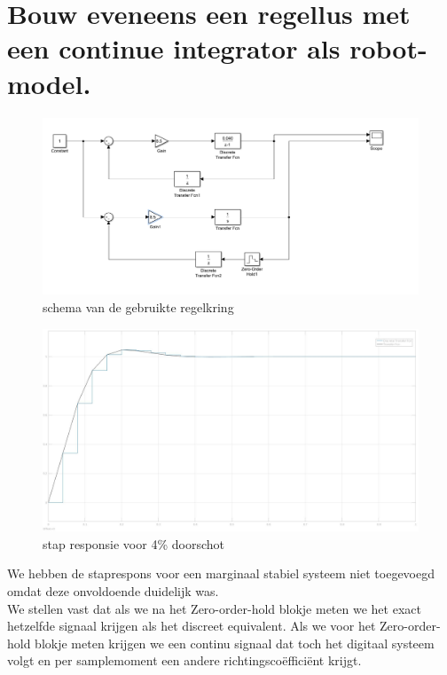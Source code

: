 \documentclass[a4paper, 12pt]{article}
\begin{document}
\section{Bouw eveneens een regellus met een continue integrator als robot-model.}

\begin{figure}[!h]
	\includegraphics[width=1\linewidth]{Labo3_5_systeem2.jpg}
	\caption{schema van de gebruikte regelkring}
\end{figure}

\begin{figure}[!h]
	\includegraphics[width=1\linewidth]{Labo3_5_stapresponse3.jpg}
	\caption{stap responsie voor 4\% doorschot}
\end{figure}

We hebben de staprespons voor een marginaal stabiel systeem niet toegevoegd omdat deze onvoldoende duidelijk was. \\

We stellen vast dat als we na het Zero-order-hold blokje meten we het exact hetzelfde signaal krijgen als het discreet equivalent. Als we voor het Zero-order-hold blokje meten krijgen we een continu signaal dat toch het digitaal systeem volgt en per samplemoment een andere richtingscoëfficiënt krijgt.
\end{document}
